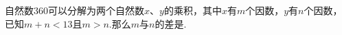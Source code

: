 
自然数$360$可以分解为两个自然数$x$、$y$的乘积，其中$x$有$m$个因数，$y$有$n$个因数，已知$m+n<13$且$m>n$.那么$m$与$n$的差是\key{\hspace{4em}}.\\

